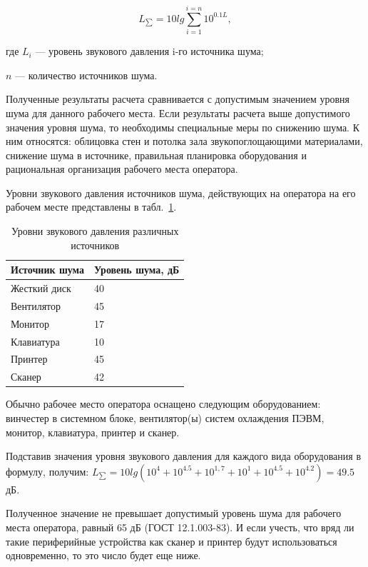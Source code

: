 \begin{equation}
	L_{\sum}=10 lg \sum^{i=n}_{i=1} 10^{0.1L},
\end{equation}
\begin{ESKDexplanation}
	\item где $L_i$ --- уровень звукового давления i-го источника шума;
	\item $n$ --- количество источников шума.
\end{ESKDexplanation}

Полученные результаты расчета сравнивается с допустимым значением уровня шума для данного рабочего места.
Если результаты расчета выше допустимого значения уровня шума, то необходимы специальные меры по снижению шума.
К ним относятся: облицовка стен и потолка зала звукопоглощающими материалами, снижение шума в источнике, правильная планировка оборудования и рациональная организация рабочего места оператора.

Уровни звукового давления источников шума, действующих на оператора на его рабочем месте представлены в табл.~\ref{tab:ecol-noisesource}.

\begin{footnotesize}
\begin{longtable}[h]{|p{}|p{}|}
	\caption{\label{tab:ecol-noisesource}Уровни звукового давления различных источников} \\
	\hline
		\textbf{Источник шума} & \textbf{Уровень шума, дБ} \\
	\hline \endhead
		Жесткий диск & 40 \\
	\hline
		Вентилятор & 45 \\
	\hline
		Монитор & 17 \\
	\hline
		Клавиатура & 10 \\
	\hline
		Принтер & 45 \\
	\hline
		Сканер & 42 \\
	\hline
\end{longtable}
\end{footnotesize}

Обычно рабочее место оператора оснащено следующим оборудованием: винчестер в системном блоке, вентилятор(ы) систем охлаждения ПЭВМ, монитор, клавиатура, принтер и сканер.

Подставив значения уровня звукового давления для каждого вида оборудования в формулу, получим:
$L_{\sum}=10 lg (10^4 + 10^{4.5} + 10^{1,7} + 10^1 + 10^{4.5} + 10^{4.2}) = 49.5$ дБ.

Полученное значение не превышает допустимый уровень шума для рабочего места оператора, равный 65 дБ (ГОСТ 12.1.003-83).
И если учесть, что вряд ли такие периферийные устройства как сканер и принтер будут использоваться одновременно, то это число будет еще ниже. 

